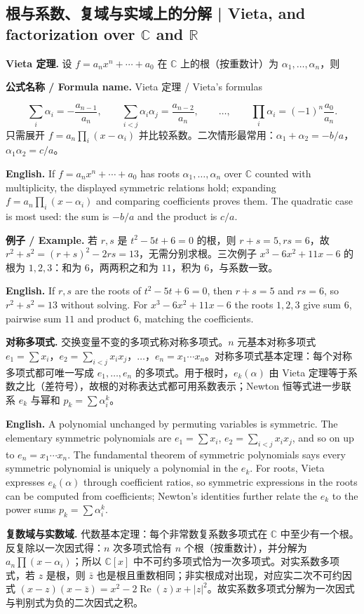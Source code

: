 \documentclass[UTF8,11pt,a4paper]{ctexart}
\newcommand{\EN}[1]{\par\noindent\textbf{English.} #1\par}
\newcommand{\FORMULA}[2]{\par\noindent\textbf{公式名称 / Formula name.} #1 / #2\par}
\newcommand{\EX}[2]{\par\noindent\textbf{例子 / Example.} #1\par\EN{#2}}
\begin{document}
\subsection{根与系数、复域与实域上的分解 | Vieta, and factorization over $\mathbb C$ and $\mathbb R$}
\noindent\textbf{Vieta 定理.} 设 $f=a_nx^n+\cdots+a_0$ 在 $\mathbb C$ 上的根（按重数计）为 $\alpha_1,\dots,\alpha_n$，则
\FORMULA{Vieta 定理}{Vieta's formulas}
\[
\sum_i\alpha_i=-\frac{a_{n-1}}{a_n},\qquad
\sum_{i<j}\alpha_i\alpha_j=\frac{a_{n-2}}{a_n},\qquad\ldots,\qquad
\prod_i\alpha_i=(-1)^n\frac{a_0}{a_n}.
\]
只需展开 $f=a_n\prod_i(x-\alpha_i)$ 并比较系数。二次情形最常用：$\alpha_1+\alpha_2=-b/a$，$\alpha_1\alpha_2=c/a$。
\EN{If $f=a_nx^n+\cdots+a_0$ has roots $\alpha_1,\dots,\alpha_n$ over $\mathbb C$ counted with multiplicity, the displayed symmetric relations hold; expanding $f=a_n\prod_i(x-\alpha_i)$ and comparing coefficients proves them. The quadratic case is most used: the sum is $-b/a$ and the product is $c/a$.}
\EX{若 $r,s$ 是 $t^2-5t+6=0$ 的根，则 $r+s=5,rs=6$，故 $r^2+s^2=(r+s)^2-2rs=13$，无需分别求根。三次例子 $x^3-6x^2+11x-6$ 的根为 $1,2,3$：和为 $6$，两两积之和为 $11$，积为 $6$，与系数一致。}{If $r,s$ are the roots of $t^2-5t+6=0$, then $r+s=5$ and $rs=6$, so $r^2+s^2=13$ without solving. For $x^3-6x^2+11x-6$ the roots $1,2,3$ give sum $6$, pairwise sum $11$ and product $6$, matching the coefficients.}
\noindent\textbf{对称多项式.} 交换变量不变的多项式称对称多项式。$n$ 元基本对称多项式 $e_1=\sum x_i$，$e_2=\sum_{i<j}x_ix_j$，$\dots$，$e_n=x_1\cdots x_n$。对称多项式基本定理：每个对称多项式都可唯一写成 $e_1,\dots,e_n$ 的多项式。用于根时，$e_k(\alpha)$ 由 Vieta 定理等于系数之比（差符号），故根的对称表达式都可用系数表示；Newton 恒等式进一步联系 $e_k$ 与幂和 $p_k=\sum\alpha_i^k$。
\EN{A polynomial unchanged by permuting variables is symmetric. The elementary symmetric polynomials are $e_1=\sum x_i$, $e_2=\sum_{i<j}x_ix_j$, and so on up to $e_n=x_1\cdots x_n$. The fundamental theorem of symmetric polynomials says every symmetric polynomial is uniquely a polynomial in the $e_k$. For roots, Vieta expresses $e_k(\alpha)$ through coefficient ratios, so symmetric expressions in the roots can be computed from coefficients; Newton's identities further relate the $e_k$ to the power sums $p_k=\sum\alpha_i^k$.}
\noindent\textbf{复数域与实数域.} 代数基本定理：每个非常数复系数多项式在 $\mathbb C$ 中至少有一个根。反复除以一次因式得：$n$ 次多项式恰有 $n$ 个根（按重数计），并分解为 $a_n\prod(x-\alpha_i)$；所以 $\mathbb C[x]$ 中不可约多项式恰为一次多项式。对实系数多项式，若 $z$ 是根，则 $\bar z$ 也是根且重数相同；非实根成对出现，对应实二次不可约因式 $(x-z)(x-\bar z)=x^2-2\operatorname{Re}(z)x+|z|^2$。故实系数多项式分解为一次因式与判别式为负的二次因式之积。
\end{document}
